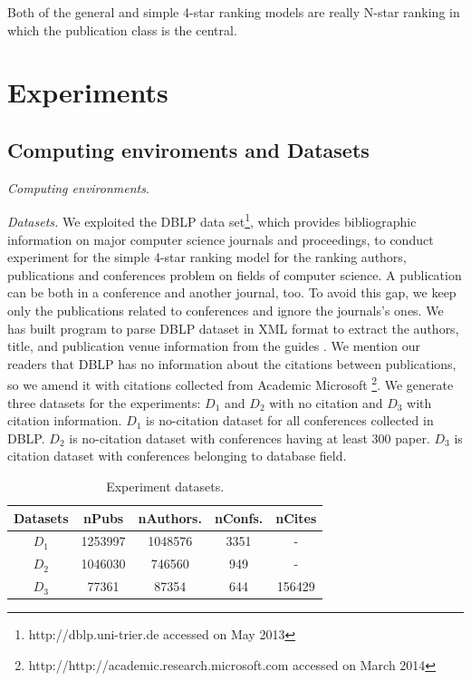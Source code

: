 \documentclass[10pt,leqno,twoside]{article}
\begin{document}
Both of the general and simple  4-star ranking models are really N-star ranking in which the publication class is the central.



\section{Experiments}\label{Sect:Experiments}
\subsection{Computing enviroments and Datasets}\label{Sect:Dataset}
\textit{Computing environments}.



\textit{Datasets.} We exploited the DBLP data set\footnote{http://dblp.uni-trier.de accessed on May 2013}, which provides bibliographic information on major computer science journals and proceedings,  to conduct experiment for the simple 4-star ranking model for the ranking authors, publications and conferences problem on fields of computer science.  A publication can be both in a conference and another journal, too.  To avoid this gap, we keep only the publications related to conferences and ignore the journals's ones. We has built program to parse DBLP dataset in XML format to extract the authors, title, and publication venue information from the guides \cite{MichaelLey06,MichaelLey09}.  We mention our readers that DBLP has no information about the citations between publications, so we amend it with citations collected from Academic Microsoft \footnote{http://http://academic.research.microsoft.com accessed on March 2014}.
We generate three datasets for the experiments: $D_1$ and $D_2$ with no citation and $D_3$ with citation information. $D_1$ is no-citation dataset for all conferences collected in DBLP. $D_2$ is no-citation dataset with conferences having at least 300 paper. $D_3$ is citation dataset with conferences belonging to database field.
\begin{center}
\begin{table}
	\centering
	\caption{Experiment datasets.}
    \label{Tab:Dataset}
    \begin{tabular}{|c|c|c|c|c|}
    \hline
    \textbf{Datasets} & \textbf{nPubs} & \textbf{nAuthors. } & \textbf{nConfs.} & \textbf{nCites} \\ \hline
   $D_1$ & 1253997 & 1048576 & 3351 & - \\
   $D_2$ & 1046030 & 746560 & 949 & - \\
   $D_3$ & 77361 & 87354 & 644 & 156429 \\
    \hline
    \end{tabular}
\end{table}
\end{center}
\end{document}
